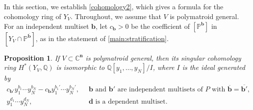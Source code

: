 \documentclass[11pt]{article}
\newtheorem{prop}[theo]{Proposition}
\theoremstyle{definition}
\numberwithin{equation}{section}
\renewcommand{\P}{\mathbb{P}}
\newcommand{\C}{\mathbb{C}}
\newcommand{\Q}{\mathbb{Q}}
\begin{document}
\subsection{}\label{sec:topresults}
In this section, we establish \cref{cohomology2}, which gives a formula for the cohomology ring of $Y_V$.
Throughout, we assume that $V$ is polymatroid general.
For an independent multiset $\mathbf b$, let $c_{\mathbf b} > 0$ be the coefficient of $[\P^{\mathbf b}]$ in   $[Y_V \cap \P^{\overline{\mathbf b}}]$, as in the statement of \cref{main:stratification}.
\begin{prop}\label{cohomology1}
  If $V \subset \C^{\mathbf n}$ is polymatroid general, then its singular cohomology ring $H^*(Y_V, \Q)$ is isomorphic to $\Q[y_1, \ldots, y_N] / I$, where $I$ is the ideal generated by 
  \begin{align*}
    \textstyle    c_{\mathbf b'} y_1^{b_1} \cdots y_N^{b_N} - c_{\mathbf b} y_1^{b_1'} \cdots y_N^{b_N'}, &\;\; \text{$\mathbf b$ and $\mathbf b'$ are independent multisets of $P$ with $\overline{\mathbf b} = \overline{\mathbf b'}$, } \\
    y_1^{d_1}\cdots y_N^{d_N}, &\;\; \text{$\mathbf d$ is a dependent multiset.}
  \end{align*}
\end{prop}
\end{document}
